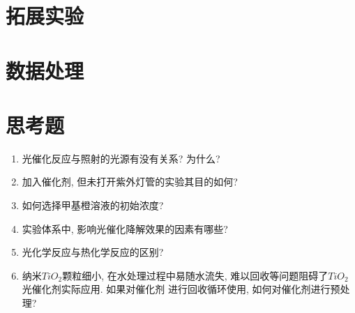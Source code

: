 \documentclass[a4paper]{article}
\begin{document}
\section{拓展实验}

\newpage
\section{数据处理}

\newpage
\section{思考题}
\begin{enumerate}
	\item 光催化反应与照射的光源有没有关系? 为什么?
	\item 加入催化剂, 但未打开紫外灯管的实验其目的如何?
	\item 如何选择甲基橙溶液的初始浓度?
	\item 实验体系中, 影响光催化降解效果的因素有哪些?
	\item 光化学反应与热化学反应的区别?
	\item 纳米$TiO_{2}$颗粒细小, 在水处理过程中易随水流失, 
	难以回收等问题阻碍了$TiO_{2}$光催化剂实际应用. 如果对催化剂
	进行回收循环使用, 如何对催化剂进行预处理?

\end{enumerate}
\newpage
\end{document}
